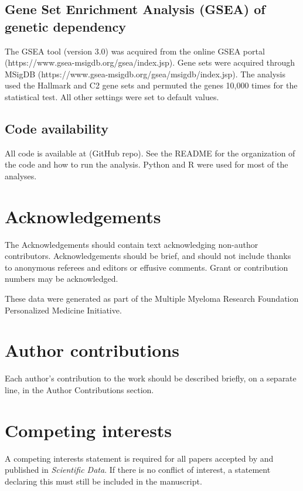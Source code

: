 \documentclass[english, 10pt, letterpaper]{article}
\begin{document}
\subsection*{Gene Set Enrichment Analysis (GSEA) of genetic dependency}
The GSEA tool (version 3.0) was acquired from the online GSEA portal (https://www.gsea-msigdb.org/gsea/index.jsp).
Gene sets were acquired through MSigDB (https://www.gsea-msigdb.org/gsea/msigdb/index.jsp).
The analysis used the Hallmark and C2 gene sets and permuted the genes 10,000 times for the statistical test.
All other settings were set to default values.


\subsection*{Code availability}

All code is available at (GitHub repo).
See the README for the organization of the code and how to run the analysis.
Python \cite{van1995python} and R \cite{Rlang} were used for most of the analyses.



\section*{Acknowledgements}

The Acknowledgements should contain text acknowledging non-author contributors.
Acknowledgements should be brief, and should not include thanks to anonymous referees and editors or effusive comments.
Grant or contribution numbers may be acknowledged.

These data were generated as part of the Multiple Myeloma Research Foundation Personalized Medicine Initiative.

\section*{Author contributions}

Each author’s contribution to the work should be described briefly, on a separate line, in the Author Contributions section. 

\section*{Competing interests}

A competing interests statement is required for all papers accepted by and published in \emph{Scientific Data}. If there is no conflict of interest, a statement declaring this must still be included in the manuscript.
\end{document}
